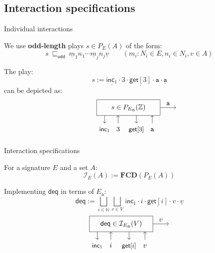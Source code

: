 \documentclass[aspectratio=141]{beamer}
\newcommand{\kw}[1]{\ensuremath{ \mathsf{#1} }}
\newcommand{\deqpic}[3]{%
  \begin{tikzpicture}[scale=0.4]
    \draw (-4,-1) rectangle (4,1);
    \node (x) at (0,0) {$#1$};
    \draw[->] (-3, -1) -- (-3, -2);
    \node[anchor=base] at (-3, -3) {\small $\kw{inc}_1$};
    \draw[<-] (-1.3, -1) -- (-1.3, -2);
    \node[anchor=base] at (-1.3, -3) {$#2$};
    \draw[->] (1, -1) -- (1, -2);
    \node[anchor=base] at (1, -3) {\small $\kw{get}[#2]$};
    \draw[<-] (3, -1) -- (3, -2);
    \node[anchor=base] at (3, -3) {$#3$};
    \draw[->] (4,0) -- node[above] {$#3$} (6,0);
  \end{tikzpicture}%
}
\begin{document}
\subsection{Interaction specifications}

\begin{frame}{Individual interactions} %
\begin{definition}[Plays]
We use \textbf{odd-length} plays $s \in P_E(A)$ of the form:
\[
  s \: \sqsubseteq_\kw{odd} \:
    \underline{m}_1 n_1
    \cdots
    \underline{m}_j n_j
    \underline{v}
  \qquad
  (m_i \mathop{:} N_i \in E, n_i \in N_i, v \in A)
\]
\end{definition}
\pause
\begin{example}
  The play:
  \[
    s :=
    \underline{\kw{inc}_1} \cdot 3 \cdot
    \underline{\kw{get}[3]} \cdot \mathtt{a} \cdot
    \underline{\mathtt{a}}
  \]
  can be depicted as:
  \[
    \qquad
    \deqpic{s \in {P}_{E_\kw{rb}}(\mathbb{Z})}{3}{\mathtt{a}}
  \]
\end{example}
\end{frame}

\begin{frame}{Interaction specifications} %
  \begin{definition}
    For a signature $E$ and a set $A$:
    \[
      \mathcal{I}_E(A) := \mathbf{FCD}(P_E(A))
    \]
  \end{definition}
  \pause
  \begin{example}
    Implementing $\kw{deq}$ in terms of $E_\kw{a}$:
    \[
      \kw{deq} :=
        \bigsqcup_{i \in \mathbb{N}}
        \bigsqcup_{v \in V}
          \, \underline{\kw{inc}_1} \cdot i \cdot
             \underline{\kw{get}[i]} \cdot v \cdot \underline{v}
    \]
    \[
      \deqpic{\kw{deq} \in \mathcal{I}_{E_\kw{rb}}(V)}{i}{v}
    \]
  \end{example}
\end{frame}
\end{document}

